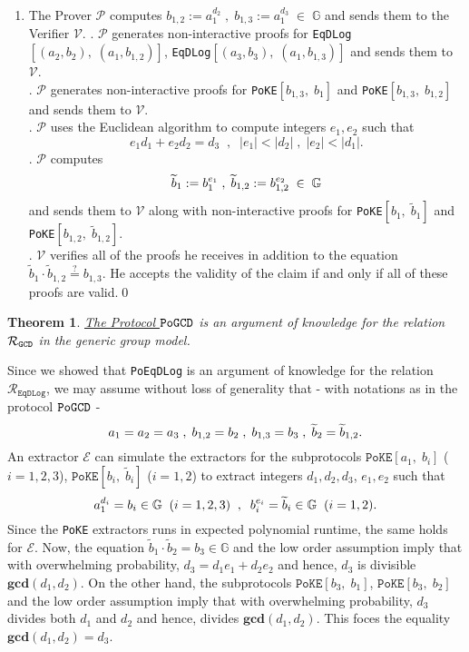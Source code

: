 \documentclass[11pt, lettersize, notitlepage, leqno, footskip=0.6cm]{article}
\newcommand{\ttt}{\texttt}
\newcommand{\bG}{\mathbb{G}}
\newcommand{\wti}{\widetilde}
\newcommand{\mc}{\mathcal}
\newcommand{\mbf}{\mathbf}
\newcommand{\mP}{\mc{P}}
\newcommand{\V}{\mc{V}}
\newcommand{\vs}{\vspace{-0.15cm}}
\newcommand{\noin}{\noindent}
\newcommand{\op}{overwhelming probability}
\newcommand{\GCD}{\mbf{gcd}}
\newcommand{\E}{\mc{E}}
\newtheorem{Thm}{Theorem}[section]
\numberwithin{equation}{section}
\begin{document}
\begin{enumerate}[wide, labelwidth=!, labelindent=0pt]\vs \item The Prover $\mc{P}$ computes $b_{1,2}:= a_1^{d_2}\;,\; b_{1,3}:= a_1^{d_3}\;\in\;\bG$ and sends them to the Verifier $\V$.
\noin 2. $\mP$ generates non-interactive proofs for \verb|EqDLog|$[(a_2, b_2),\; (a_1, b_{1,2})]$, \verb|EqDLog|$[(a_3, b_3),\; (a_1, b_{1,3})]$ and sends them to $\mc{V}$.\\
\noin 3. $\mc{P}$ generates non-interactive proofs for \verb|PoKE|$[b_{1,3},\;b_1 ]$ and \verb|PoKE|$[b_{1,3},\;b_{1,2} ]$ and sends them to $\V$.\\
\noin 4. $\mc{P}$ uses the Euclidean algorithm to compute integers $e_1, e_2$ such that \vs $$e_1d_1 + e_2d_2 = d_3\;\;,\;\; |e_1| < |d_2|\;,\; |e_2| < |d_1|.$$
\noin 5. $\mc{P}$ computes $$\wti{b}_1:= b_1^{e_1}\;,\; \wti{b}_{1,2}:= b_{1,2}^{e_2}\;\in\;\bG \vs $$ and sends them to $\V$ along with non-interactive proofs for \verb|PoKE|$[b_1,\; \wti{b}_1]$ and \verb|PoKE|$[b_{1,2},\; \wti{b}_{1,2}]$.\\
\noin 6. $\mc{V}$ verifies all of the proofs he receives in addition to the equation $\wti{b}_1\cdot \wti{b}_{1,2}\stackrel{?}{=} b_{1,3}$. He accepts the validity of the claim if and only if all of these proofs are valid.\qed \end{enumerate}



\begin{Thm}\label{GCDProof} \hyperlink{GCD}{The Protocol $\tt{PoGCD}$} is an argument of knowledge for the relation $\mc{R}_{{\tt{GCD}}}$ in the generic group model.\end{Thm}

\begin{prf} Since we showed that \verb|PoEqDLog| is an argument of knowledge for the relation $\mc{R}_{\ttt{EqDLog}}$, we may assume without loss of generality that - with notations as in the protocol \hyperlink{GCD}{$\tt{PoGCD}$} - \vs $$a_1 = a_2 = a_3\;,\; {b}_{1,2} = b_2\;,\;{b}_{1,3} = b_3\;,\;\wti{b}_{2} = \wti{b}_{1,2} . \vs $$ An extractor $\E$ can simulate the extractors for the subprotocols $\ttt{PoKE}[a_1,\; b_i]$ ($i=1,2,3$), $\ttt{PoKE}[b_i,\;\wti{b}_i]$ ($i=1,2$) to extract integers $d_1,d_2,d_3$, $e_1,e_2$ such that \vs $$a_1^{d_i} = b_i\in\bG\;\; (i=1,2,3)\;\;,\;\;b_i^{e_i} = \wti{b}_i\in\bG \;\;(i=1,2). \vs $$ Since the \ttt{PoKE} extractors runs in expected polynomial runtime, the same holds for $\E$. Now, the equation $\wti{b}_1\cdot \wti{b}_2 = b_3\in \bG$ and the low order assumption imply that with \op, $d_3 = d_1e_1 + d_2e_2 $ and hence, $d_3$ is divisible $\GCD(d_1,d_2)$. On the other hand, the subprotocols $\ttt{PoKE}[b_3,\;b_1]$, $\ttt{PoKE}[b_3,\;b_2]$ and the low order assumption imply that with \op, $d_3$ divides both $d_1$ and $d_2$ and hence, divides $\GCD(d_1,d_2)$. This foces the equality $\GCD(d_1,d_2) = d_3$.\end{prf}
\end{document}
